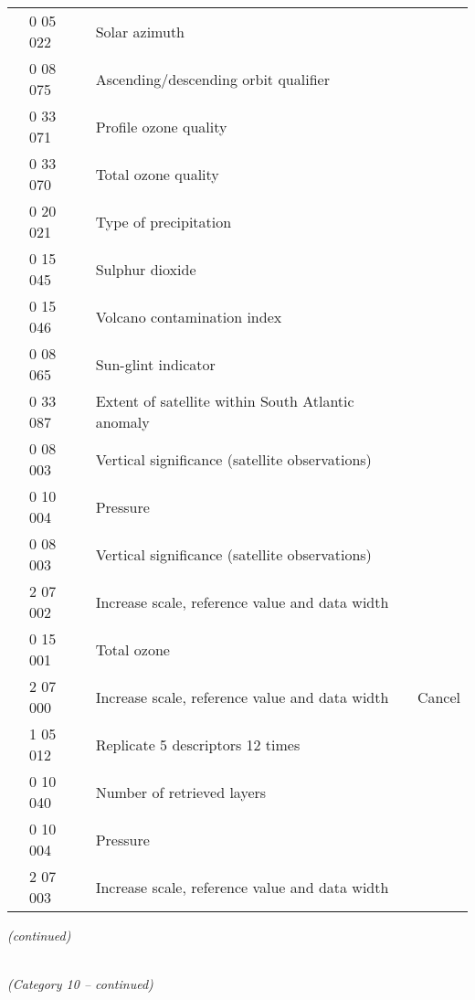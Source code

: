 \begin{longtable}[]{@{}llll@{}}
& 0 05 022 & Solar azimuth &\tabularnewline
& 0 08 075 & Ascending/descending orbit qualifier &\tabularnewline
& 0 33 071 & Profile ozone quality &\tabularnewline
& 0 33 070 & Total ozone quality &\tabularnewline
& 0 20 021 & Type of precipitation &\tabularnewline
& 0 15 045 & Sulphur dioxide &\tabularnewline
& 0 15 046 & Volcano contamination index &\tabularnewline
& 0 08 065 & Sun-glint indicator &\tabularnewline
& 0 33 087 & Extent of satellite within South Atlantic anomaly &\tabularnewline
& 0 08 003 & Vertical significance (satellite observations) &\tabularnewline
& 0 10 004 & Pressure &\tabularnewline
& 0 08 003 & Vertical significance (satellite observations) &\tabularnewline
& 2 07 002 & Increase scale, reference value and data width &\tabularnewline
& 0 15 001 & Total ozone &\tabularnewline
& 2 07 000 & Increase scale, reference value and data width & Cancel\tabularnewline
& 1 05 012 & Replicate 5 descriptors 12 times &\tabularnewline
& 0 10 040 & Number of retrieved layers &\tabularnewline
& 0 10 004 & Pressure &\tabularnewline
& 2 07 003 & Increase scale, reference value and data width &\tabularnewline
\bottomrule
\end{longtable}

\emph{(continued)}

\emph{\\
(Category 10 -- continued)}

